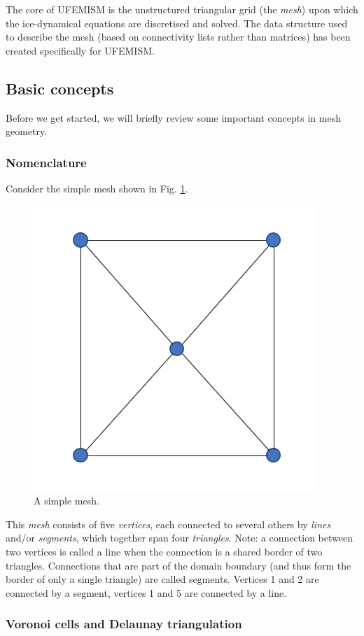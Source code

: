 \documentclass{article}
\begin{document}
The core of UFEMISM is the unstructured triangular grid (the \emph{mesh}) upon which the ice-dynamical equations are discretised and solved. The data structure used
to describe the mesh (based on connectivity lists rather than matrices) has been created specifically for UFEMISM.

\subsection{Basic concepts}

Before we get started, we will briefly review some important concepts in mesh geometry.

\subsubsection{Nomenclature}

Consider the simple mesh shown in Fig. \ref{fig:dummymesh}.

\begin{figure}[h!] \label{fig:dummymesh}
  \includegraphics[width=0.3\linewidth]{Fig_dummymesh_01.png}
  \caption{A simple mesh.}
\end{figure}

This \emph{mesh} consists of five \emph{vertices}, each connected to several others by \emph{lines} and/or \emph{segments}, which together span four \emph{triangles}. Note: a connection between two vertices is called a line when the connection is a shared border of two triangles. Connections that are part of the domain boundary (and thus form the border of only a single triangle) are called segments. Vertices 1 and 2 are connected by a segment, vertices 1 and 5 are connected by a line.

\subsubsection{Voronoi cells and Delaunay triangulation}
\end{document}
